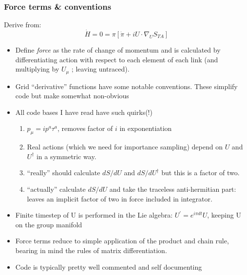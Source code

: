 \documentclass[pdf,ps,8pt]{beamer}
\begin{document}
\begin{frame}[fragile]\small\frametitle{Force terms \& conventions }

  Derive from:
  $$
  \dot{H} = 0 = \pi \left[ \dot \pi + i  U \cdot \nabla_U S_{TA} \right]
  $$
  \begin{itemize}
   \item Define \emph{force} as the rate of change of momentum and is calculated by differentiating
     action with respect to each element of each link (and multiplying by $U_\mu$ ; leaving untraced).
   \item Grid ``derivative'' functions have some notable conventions. These simplify code but make somewhat non-obvious
   \item All code bases I have read have such quirks(!)
  \begin{enumerate}
     \item $p_\mu = i p^a \tau^a $, removes factor of $i$ in exponentiation
     \item Real actions (which we need for importance sampling) depend on $U$ and $U^\dagger$ in a symmetric way.
     \item ``really'' should calculate $dS/dU$ and $dS/dU^\dagger$ but this is a factor of two.
     \item ``actually'' calculate $dS/dU$ and take the traceless anti-hermitian part: leaves an implicit factor of two in force included in integrator.
  \end{enumerate}
  \item Finite timestep of U is performed in the Lie algebra: $U^\prime = e^{i \pi dt} U$, keeping U on the group manifold
  \item Force terms reduce to simple application of the product and chain rule, bearing in mind the rules of matrix differentiation.
  \item Code is typically pretty well commented and self documenting
  \end{itemize}

\end{frame}
\end{document}
